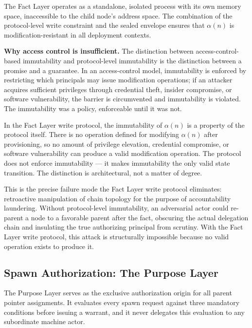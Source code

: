 The Fact Layer operates as a standalone, isolated process with its own memory space, inaccessible to the child node's address space. The combination of the protocol-level write constraint and the sealed envelope ensures that $\alpha(n)$ is modification-resistant in all deployment contexts.

\medskip
\noindent\textbf{Why access control is insufficient.} The distinction between access-control-based immutability and protocol-level immutability is the distinction between a promise and a guarantee. In an access-control model, immutability is enforced by restricting which principals may issue modification operations; if an attacker acquires sufficient privileges through credential theft, insider compromise, or software vulnerability, the barrier is circumvented and immutability is violated. The immutability was a policy, enforceable until it was not.

In the Fact Layer write protocol, the immutability of $\alpha(n)$ is a property of the protocol itself. There is no operation defined for modifying $\alpha(n)$ after provisioning, so no amount of privilege elevation, credential compromise, or software vulnerability can produce a valid modification operation. The protocol does not enforce immutability --- it makes immutability the only valid state transition. The distinction is architectural, not a matter of degree.

This is the precise failure mode the Fact Layer write protocol eliminates: retroactive manipulation of chain topology for the purpose of accountability laundering. Without protocol-level immutability, an adversarial actor could re-parent a node to a favorable parent after the fact, obscuring the actual delegation chain and insulating the true authorizing principal from scrutiny. With the Fact Layer write protocol, this attack is structurally impossible because no valid operation exists to produce it.

\subsection{Spawn Authorization: The Purpose Layer}
\label{sec:purpose-layer-authorization}

The Purpose Layer serves as the exclusive authorization origin for all parent pointer assignments. It evaluates every spawn request against three mandatory conditions before issuing a warrant, and it never delegates this evaluation to any subordinate machine actor.

